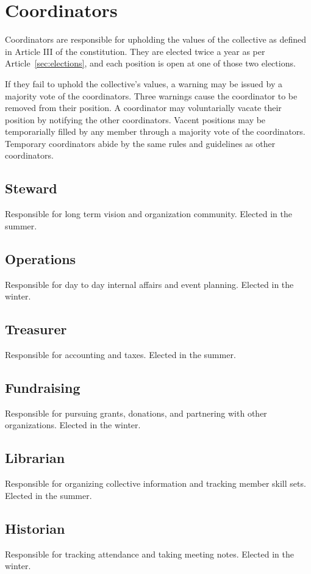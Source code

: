 \chapter{Coordinators}\label{sec:coordinators}

Coordinators are responsible for upholding the values of the collective as defined in Article III of the constitution. They are elected twice a year as per Article~\ref{sec:elections}, and each position is open at one of those two elections.

If they fail to uphold the collective's values, a warning may be issued by a majority vote of the coordinators. Three warnings cause the coordinator to be removed from their position. A coordinator may voluntarially vacate their position by notifying the other coordinators. Vacent positions may be temporarially filled by any member through a majority vote of the coordinators. Temporary coordinators abide by the same rules and guidelines as other coordinators.

\section{Steward}\label{sec:steward}
Responsible for long term vision and organization community. Elected in the summer.
\section{Operations}\label{sec:operations}
Responsible for day to day internal affairs and event planning. Elected in the winter.
\section{Treasurer}\label{sec:treasurer}
Responsible for accounting and taxes. Elected in the summer.
\section{Fundraising}\label{sec:fundraising}
Responsible for pursuing grants, donations, and partnering with other organizations. Elected in the winter.
\section{Librarian}\label{sec:librarian}
Responsible for organizing collective information and tracking member skill sets. Elected in the summer.
\section{Historian}\label{sec:historian}
Responsible for tracking attendance and taking meeting notes. Elected in the winter.
